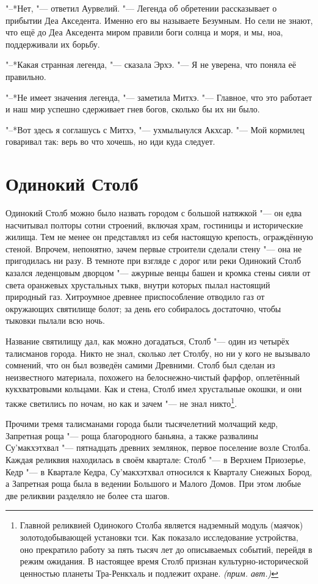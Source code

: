 \documentclass[a4paper,10pt,fleqn]{book}
\newcommand{\authornote}{\textit{(прим. авт.)}}
\begin{document}
"--*Нет, "--- ответил Аурвелий.
"--- Легенда об обретении рассказывает о прибытии Деа Акседента.
Именно его вы называете Безумным.
Но сели не знают, что ещё до Деа Акседента миром правили боги солнца и моря, и мы, ноа, поддерживали их борьбу.

"--*Какая странная легенда, "--- сказала Эрхэ.
"--- Я не уверена, что поняла её правильно.

"--*Не имеет значения легенда, "--- заметила Митхэ.
"--- Главное, что это работает и наш мир успешно сдерживает гнев богов, сколько бы их ни было.

"--*Вот здесь я соглашусь с Митхэ, "--- ухмыльнулся Акхсар.
"--- Мой кормилец говаривал так: верь во что хочешь, но иди куда следует.

\section{Одинокий Столб}

Одинокий Столб можно было назвать городом с большой натяжкой "--- он едва насчитывал полторы сотни строений, включая храм, гостиницы и исторические жилища.
Тем не менее он представлял из себя настоящую крепость, ограждённую стеной.
Впрочем, непонятно, зачем первые строители сделали стену "--- она не пригодилась ни разу.
В темноте при взгляде с дорог или реки Одинокий Столб казался леденцовым дворцом "--- ажурные венцы башен и кромка стены сияли от света оранжевых хрустальных тыкв, внутри которых пылал настоящий природный газ.
Хитроумное древнее приспособление отводило газ от окружающих святилище болот;
за день его собиралось достаточно, чтобы тыковки пылали всю ночь.

Название святилищу дал, как можно догадаться, Столб "--- один из четырёх талисманов города.
Никто не знал, сколько лет Столбу, но ни у кого не вызывало сомнений, что он был возведён самими Древними.
Столб был сделан из неизвестного материала, похожего на белоснежно-чистый фарфор, оплетённый кукхватровыми кольцами.
Как и стена, Столб имел хрустальные окошки, и они также светились по ночам, но как и зачем "--- не знал никто\footnote
{Главной реликвией Одинокого Столба является надземный модуль (маячок) золотодобывающей установки тси. Как показало исследование устройства, оно прекратило работу за пять тысяч лет до описываемых событий, перейдя в режим ожидания. В настоящее время Столб признан культурно-исторической ценностью планеты Тра-Ренкхаль и подлежит охране. \authornote}.

Прочими тремя талисманами города были тысячелетний молчащий кедр, Запретная роща "--- роща благородного баньяна, а также развалины Су'макхэтхвал "--- пятнадцать древних землянок, первое поселение возле Столба.
Каждая реликвия находилась в своём квартале: Столб "--- в Верхнем Приозерье, Кедр "--- в Квартале Кедра, Су'макхэтхвал относился к Кварталу Снежных Бород, а Запретная роща была в ведении Большого и Малого Домов.
При этом любые две реликвии разделяло не более ста шагов.
\end{document}
